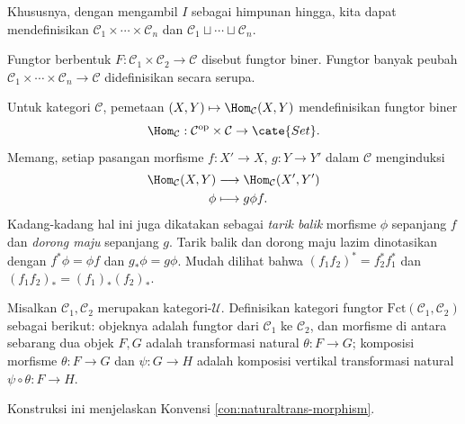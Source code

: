 Khususnya, dengan mengambil $I$ sebagai himpunan hingga, kita dapat mendefinisikan $\mathcal{C}_1 \times \cdots \times \mathcal{C}_n$ dan $\mathcal{C}_1 \sqcup \cdots \sqcup \mathcal{C}_n$.

\begin{definition}
	Fungtor berbentuk $F: \mathcal{C}_1 \times \mathcal{C}_2 \to \mathcal{C}$ disebut fungtor biner. Fungtor banyak peubah $\mathcal{C}_1 \times \cdots \times \mathcal{C}_n \to \mathcal{C}$ didefinisikan secara serupa.
\end{definition}

\begin{example}\label{eg:Hom-functor} 
	Untuk kategori $\mathcal{C}$, pemetaan $(X,Y)\mapsto\Hom_{\mathcal{C}}(X,Y)$ mendefinisikan fungtor biner
	\[ \Hom_{\mathcal{C}}: \mathcal{C}^\text{op} \times \mathcal{C}  \to \cate{Set}. \]
	Memang, setiap pasangan morfisme $f: X' \to X$, $g: Y \to Y'$ dalam $\mathcal{C}$ menginduksi
	\begin{align*}
		\Hom_{\mathcal{C}}(X, Y) & \longrightarrow \Hom_{\mathcal{C}}(X', Y') \\
		\phi & \longmapsto g \phi f .
	\end{align*}
	Kadang-kadang hal ini juga dikatakan sebagai \emph{tarik balik} morfisme $\phi$ sepanjang $f$ dan \emph{dorong maju} sepanjang $g$. Tarik balik dan dorong maju lazim dinotasikan dengan $f^* \phi = \phi f$ dan $g_* \phi = g\phi$.
	Mudah dilihat bahwa $(f_1 f_2)^* = f_2^* f_1^*$ dan $(f_1 f_2)_* = (f_1)_* (f_2)_*$.
\end{example}

\begin{definition}
	Misalkan $\mathcal{C}_1, \mathcal{C}_2$ merupakan kategori-$\mathcal{U}$. Definisikan kategori fungtor $\text{Fct}(\mathcal{C}_1, \mathcal{C}_2)$ sebagai berikut: objeknya adalah fungtor dari $\mathcal{C}_1$ ke $\mathcal{C}_2$, dan morfisme di antara sebarang dua objek $F, G$ adalah transformasi natural $\theta: F \to G$; komposisi morfisme $\theta: F \to G$ dan $\psi: G \to H$ adalah komposisi vertikal transformasi natural $\psi \circ \theta: F \to H$.
\end{definition}
Konstruksi ini menjelaskan Konvensi \ref{con:naturaltrans-morphism}.

